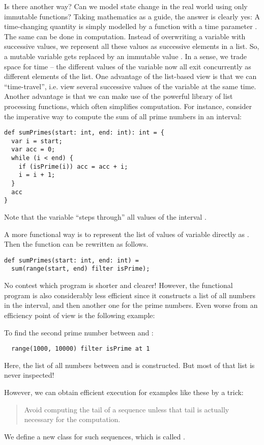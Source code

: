 {Is there another way? Can we model state change in the real world
using only immutable functions? Taking mathematics as a guide, the
answer is clearly yes: A time-changing quantity is simply modelled by
a function  with a time parameter . The same can be
done in computation. Instead of overwriting a variable with successive
values, we represent all these values as successive elements in a
list. So, a mutable variable  gets replaced by an
immutable value . In a sense, we trade space for
time -- the different values of the variable now all exit concurrently
as different elements of the list.  One advantage of the list-based
view is that we can ``time-travel'', i.e. view several successive
values of the variable at the same time. Another advantage is that we
can make use of the powerful library of list processing functions,
which often simplifies computation. For instance, consider the
imperative way to compute the sum of all prime numbers in an interval:
\begin{lstlisting}
def sumPrimes(start: int, end: int): int = {
  var i = start;
  var acc = 0;
  while (i < end) {
    if (isPrime(i)) acc = acc + i;
    i = i + 1;
  }
  acc
}
\end{lstlisting}
Note that the variable  ``steps through'' all values of the interval
.

A more functional way is to represent the list of values of variable  directly as . Then the function can be rewritten as follows.
\begin{lstlisting}
def sumPrimes(start: int, end: int) =
  sum(range(start, end) filter isPrime);
\end{lstlisting}

No contest which program is shorter and clearer!  However, the
functional program is also considerably less efficient since it
constructs a list of all numbers in the interval, and then another one
for the prime numbers. Even worse from an efficiency point of view is
the following example:

To find the second prime number between  and :
\begin{lstlisting}
  range(1000, 10000) filter isPrime at 1
\end{lstlisting}
Here, the list of all numbers between  and  is
constructed.  But most of that list is never inspected!

However, we can obtain efficient execution for examples like these by
a trick:
\begin{quote}
 Avoid computing the tail of a sequence unless that tail is actually
     necessary for the computation.
\end{quote}
We define a new class for such sequences, which is called .

}
